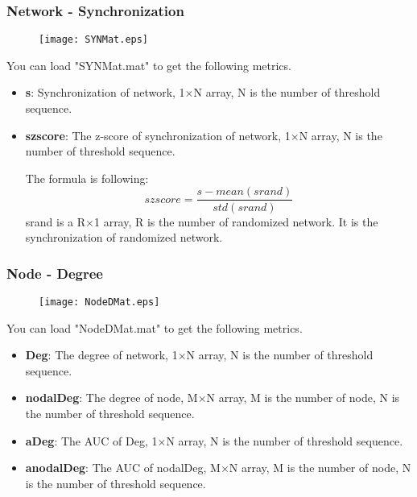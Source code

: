 \documentclass[11pt]{article}
\begin{document}
			\subsubsection{Network - Synchronization}
				\begin{figure}
					\begin{center}
						\texttt{[image: SYNMat.eps]}
					\end{center}
				\end{figure}
				You can load "SYNMat.mat" to get the following metrics.
				\begin{itemize}
					\item \textbf{s}: Synchronization of network,
						1$\times$N array, N is the number of threshold sequence.
					\item \textbf{szscore}: The z-score of synchronization of network,
						1$\times$N array, N is the number of threshold sequence.

						The formula is following:
						$$szscore=\frac{s-mean(srand)}{std(srand)}$$
						srand is a R$\times$1 array, R is the number of randomized network. 
						It is the synchronization of randomized network.
				\end{itemize}
			\subsubsection{Node - Degree}
				\begin{figure}
					\begin{center}
						\texttt{[image: NodeDMat.eps]}
					\end{center}
				\end{figure}
				You can load "NodeDMat.mat" to get the following metrics.
				\begin{itemize}
					\item \textbf{Deg}: The degree of network,
						1$\times$N array, N is the number of threshold sequence.
					\item \textbf{nodalDeg}: The degree of node,
						M$\times$N array, M is the number of node, N is the number of threshold sequence.
					\item \textbf{aDeg}: The AUC of Deg,
						1$\times$N array, N is the number of threshold sequence.
					\item \textbf{anodalDeg}: The AUC of nodalDeg,
						M$\times$N array, M is the number of node, N is the number of threshold sequence.
				\end{itemize}
\end{document}
